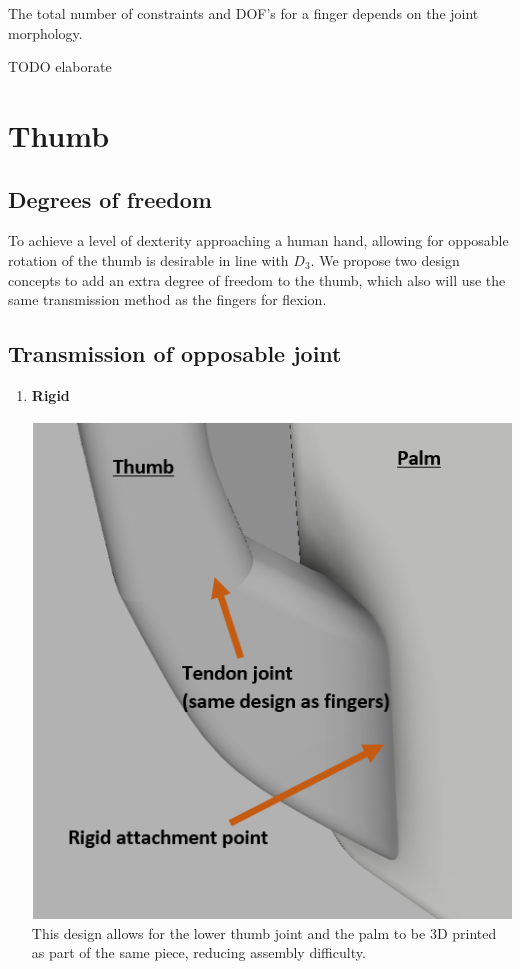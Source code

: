 \documentclass[12pt,3p]{report}
\begin{document}
\begin{multicols}{2}
		The total number of constraints and DOF's for a finger depends on the joint morphology.
		
		TODO elaborate



	\section{Thumb}
	
		\subsection{Degrees of freedom}
To achieve a level of dexterity approaching a human hand, allowing for opposable rotation of the thumb is desirable in line with $D_3$. We propose two design concepts to add an extra degree of freedom to the thumb, which also will use the same transmission method as the fingers for flexion. 

		
		\subsection{Transmission of opposable joint}
			\begin{enumerate}
			\item \textbf{Rigid} {
			
			\includegraphics[scale=0.55]{rigid_thumb.PNG}
						This design allows for the lower thumb joint and the palm to be 3D printed as part of the same piece, reducing assembly difficulty.
			}


\end{enumerate}
\end{multicols}
\end{document}
